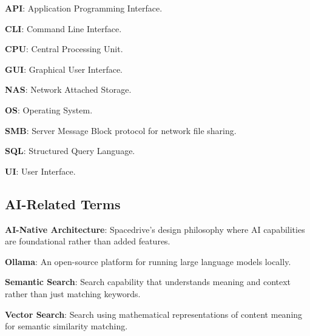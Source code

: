 \documentclass[sigconf]{acmart}
\begin{document}
\textbf{API}: Application Programming Interface.

\textbf{CLI}: Command Line Interface.

\textbf{CPU}: Central Processing Unit.

\textbf{GUI}: Graphical User Interface.

\textbf{NAS}: Network Attached Storage.

\textbf{OS}: Operating System.

\textbf{SMB}: Server Message Block protocol for network file sharing.

\textbf{SQL}: Structured Query Language.

\textbf{UI}: User Interface.

\subsection*{AI-Related Terms}

\textbf{AI-Native Architecture}: Spacedrive's design philosophy where AI capabilities are foundational rather than added features.

\textbf{Ollama}: An open-source platform for running large language models locally.

\textbf{Semantic Search}: Search capability that understands meaning and context rather than just matching keywords.

\textbf{Vector Search}: Search using mathematical representations of content meaning for semantic similarity matching.




\end{document}
